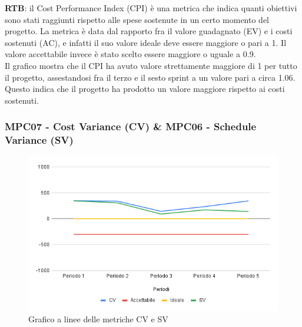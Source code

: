 \documentclass[10pt]{article}
\begin{document}
\begin{justify}
\textbf{RTB}: il Cost Performance Index (CPI) è una metrica che indica quanti obiettivi sono stati raggiunti rispetto alle spese sostenute in un certo momento del
progetto. La metrica è data dal rapporto fra il valore guadagnato (EV) e i costi sostenuti (AC), e infatti il suo valore ideale deve essere maggiore o pari a 1.
Il valore accettabile invece è stato scelto essere maggiore o uguale a 0.9.\\
Il grafico mostra che il CPI ha avuto valore strettamente maggiore di 1 per tutto il progetto, assestandosi fra il terzo e il sesto sprint a un valore pari a circa 1.06.
Questo indica che il progetto ha prodotto un valore maggiore rispetto ai costi sostenuti.


\subsubsection{MPC07 - Cost Variance (CV) \& MPC06 - Schedule Variance (SV)}

\begin{figure}[H]
  \centering
  \includegraphics[width=0.9\linewidth]{CV-SV.png}
  \caption{Grafico a linee delle metriche CV e SV}
  \label{fig:CV-SVchart}
\end{figure}


\end{justify}
\end{document}
